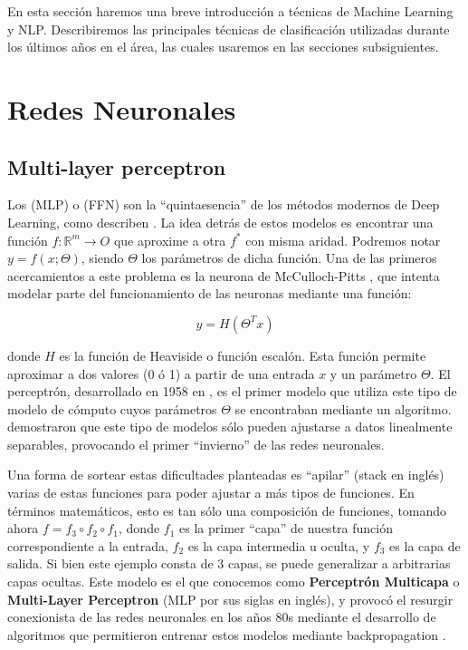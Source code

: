En esta sección haremos una breve introducción a técnicas de Machine Learning y NLP. Describiremos las principales técnicas de clasificación utilizadas durante los últimos años en el área, las cuales usaremos en las secciones subsiguientes.

\section{Redes Neuronales}

\subsection{Multi-layer perceptron}

Los  (MLP) o  (FFN) son la ``quintaesencia'' de los métodos modernos de Deep Learning, como describen \citet{goodfellow2016deep}. La idea detrás de estos modelos es encontrar una función $f: \mathbb{R}^m \rightarrow O$ que aproxime a otra $f^*$ con misma aridad. Podremos notar $ y = f(x; \Theta)$, siendo $\Theta$ los parámetros de dicha función. Una de las primeros acercamientos a este problema es la neurona de McCulloch-Pitts \cite{mcculloch1943logical}, que intenta modelar parte del funcionamiento de las neuronas mediante una función:

\begin{equation*}
    y = H(\Theta^T x)
\end{equation*}

donde $H$ es la función de Heaviside o función escalón. Esta función permite aproximar a dos valores (0 ó 1) a partir de una entrada $x$ y un parámetro $\Theta$. El perceptrón, desarrollado en 1958 en \citet{rosenblatt1958perceptron}, es el primer modelo que utiliza este tipo de modelo de cómputo cuyos parámetros $\Theta$ se encontraban mediante un algoritmo. \citet{minsky1969perceptrons} demostraron que este tipo de modelos sólo pueden ajustarse a datos linealmente separables, provocando el primer ``invierno'' de las redes neuronales.

Una forma de sortear estas dificultades planteadas es ``apilar'' (stack en inglés) varias de estas funciones para poder ajustar a más tipos de funciones. En términos matemáticos, esto es tan sólo una composición de funciones, tomando ahora $f = f_3 \circ f_2 \circ f_1$, donde $f_1$ es la primer ``capa'' de nuestra función correspondiente a la entrada, $f_2$ es la capa intermedia u oculta, y $f_3$ es la capa de salida. Si bien este ejemplo consta de 3 capas, se puede generalizar a arbitrarias capas ocultas. Este modelo es el que conocemos como \textbf{Perceptrón Multicapa} o \textbf{Multi-Layer Perceptron} (MLP por sus siglas en inglés), y provocó el resurgir conexionista de las redes neuronales en los años 80s mediante el desarrollo de algoritmos que permitieron entrenar estos modelos mediante backpropagation \cite{rumelhart1986learning}.

